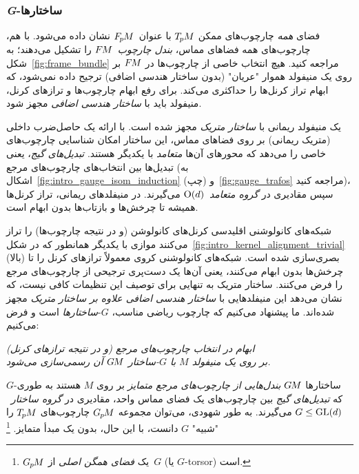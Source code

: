 \subsubsection{\textit{G}-ساختارها}
\label{sec:visual_intro_GM_subsub}

فضای \emph{همه} چارچوب‌های ممکن $T_{\mkern-1.5mu p}\mkern-.5muM$ با عنوان~$F_{\mkern-1.5mu p}\mkern-1.0muM$ نشان داده می‌شود.
با هم، چارچوب‌های همه فضاهای مماس، \emph{بندل چارچوب}~$F\mkern-1.5muM$ را تشکیل می‌دهند؛ به شکل~\ref{fig:frame_bundle} مراجعه کنید.
هیچ انتخاب خاصی از چارچوب‌ها در $F\mkern-1.5muM$ بر روی یک منیفولد هموار "عریان" (بدون ساختار هندسی اضافی) ترجیح داده نمی‌شود، که ابهام تراز کرنل‌ها را حداکثری می‌کند.
برای رفع ابهام چارچوب‌ها و ترازهای کرنل، منیفولد باید با \emph{ساختار هندسی اضافی} مجهز شود.


یک منیفولد ریمانی با \emph{ساختار متریک} مجهز شده است.
با ارائه یک حاصل‌ضرب داخلی (متریک ریمانی) بر روی فضاهای مماس، این ساختار امکان شناسایی چارچوب‌های خاصی را می‌دهد که محورهای آن‌ها \emph{متعامد} با یکدیگر هستند.
\emph{تبدیل‌های گیج}، یعنی تبدیل‌ها بین انتخاب‌های چارچوب‌های مرجع (به اشکال~\ref{fig:intro_gauge_isom_induction} (چپ) و~\ref{fig:gauge_trafos} مراجعه کنید)، سپس مقادیری در \emph{گروه متعامد}~$\operatorname{O}(d)$ می‌گیرند.
در منیفلدهای ریمانی، تراز کرنل‌ها همیشه تا چرخش‌ها و بازتاب‌ها بدون ابهام است.


شبکه‌های کانولوشنی اقلیدسی کرنل‌های کانولوشن (و در نتیجه چارچوب‌ها) را تراز می‌کنند
موازی با یکدیگر همانطور که در شکل~\ref{fig:intro_kernel_alignment_trivial} (بالا) بصری‌سازی شده است.
شبکه‌های کانولوشنی کروی معمولاً ترازهای کرنل را تا چرخش‌ها بدون ابهام می‌کنند، یعنی آن‌ها یک دست‌پری ترجیحی از چارچوب‌های مرجع را فرض می‌کنند.
ساختار متریک به تنهایی برای توصیف این تنظیمات کافی نیست، که نشان می‌دهد این منیفلدهایی با \emph{ساختار هندسی اضافی علاوه بر ساختار متریک} مجهز شده‌اند.
ما پیشنهاد می‌کنیم که چارچوب ریاضی مناسب، $G$-\emph{ساختارها} است و فرض می‌کنیم:

\begin{minipage}{\textwidth}
	\begin{center}\it
		ابهام در انتخاب چارچوب‌های مرجع (و در نتیجه ترازهای کرنل) \\
		بر روی یک منیفولد $M$ با $G$-ساختار $G\mkern-1.4muM$ آن رسمی‌سازی می‌شود.
	\end{center}
\end{minipage}

$G$-ساختارها $G\mkern-1.4muM$ \emph{بندل‌هایی از چارچوب‌های مرجع متمایز} بر روی $M$ هستند به طوری که \emph{تبدیل‌های گیج} بین چارچوب‌های یک فضای مماس واحد، مقادیری در \emph{گروه ساختار}~${G\leq\operatorname{GL}(d)}$ می‌گیرند.
به طور شهودی، می‌توان مجموعه $G_{\mkern-1.3mu p}\mkern-1.2muM$ چارچوب‌های $T_{\mkern-1.5mu p}\mkern-.5muM$ را "شبیه" $G$ دانست، با این حال، بدون یک مبدأ متمایز.%
\footnote{
	$G_{\mkern-1.3mu p}\mkern-1.2muM$ یک \emph{فضای همگن اصلی} از~$G$ (یا $G$-torsor) است.
}


